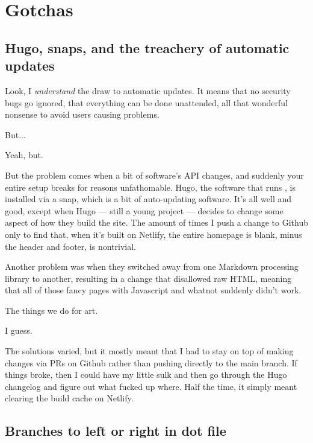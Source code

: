 \chapter*{Gotchas}

\begin{paracol}{2}
\begin{leftcolumn}

\label{gotchas}

\label{hugoversions}\section*{Hugo, snaps, and the treachery of automatic updates}

Look, I \emph{understand} the draw to automatic updates. It means that no security bugs go ignored, that everything can be done unattended, all that wonderful nonsense to avoid users causing problems.

\begin{ally}
  But...
\end{ally}
Yeah, but.

But the problem comes when a bit of software's API changes, and suddenly your entire setup breaks for reasons unfathomable. Hugo, the software that runs \allyId, is installed via a snap, which is a bit of auto-updating software. It's all well and good, except when Hugo --- still a young project --- decides to change some aspect of how they build the site. The amount of times I push a change to Github only to find that, when it's built on Netlify, the entire homepage is blank, minus the header and footer, is nontrivial.

Another problem was when they switched away from one Markdown processing library to another, resulting in a change that disallowed raw HTML, meaning that all of those fancy pages with Javascript and whatnot suddenly didn't work.

\begin{ally}
  The things we do for art.
\end{ally}
I guess.

The solutions varied, but it mostly meant that I had to stay on top of making changes via PRs on Github rather than pushing directly to the main branch. If things broke, then I could have my little sulk and then go through the Hugo changelog and figure out what fucked up where. Half the time, it simply meant clearing the build cache on Netlify.

\label{branchdir}\section*{Branches to left or right in dot file}


\end{leftcolumn}
\end{paracol}
